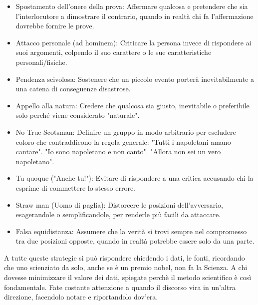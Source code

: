 \documentclass[12pt]{book} %
\begin{document}
\begin{itemize}
\item Spostamento dell’onere della prova: Affermare qualcosa e pretendere che sia l'interlocutore a dimostrare il contrario, quando in realtà chi fa l'affermazione dovrebbe fornire le prove.
\item Attacco personale (ad hominem): Criticare la persona invece di rispondere ai suoi argomenti, colpendo il suo carattere o le sue caratteristiche personali/fisiche.
\item Pendenza scivolosa: Sostenere che un piccolo evento porterà inevitabilmente a una catena di conseguenze disastrose.
\item Appello alla natura: Credere che qualcosa sia giusto, inevitabile o preferibile solo perché viene considerato "naturale".
\item No True Scotsman: Definire un gruppo in modo arbitrario per escludere coloro che contraddicono la regola generale: "Tutti i napoletani amano cantare". "Io sono napoletano e non canto". "Allora non sei un vero napoletano".
\item Tu quoque ("Anche tu!"): Evitare di rispondere a una critica accusando chi la esprime di commettere lo stesso errore.
\item Straw man (Uomo di paglia): Distorcere le posizioni dell’avversario, esagerandole o semplificandole, per renderle più facili da attaccare.
\item Falsa equidistanza: Assumere che la verità si trovi sempre nel compromesso tra due posizioni opposte, quando in realtà potrebbe essere solo da una parte.
\end{itemize}

A tutte queste strategie si può rispondere chiedendo i dati, le fonti, ricordando che uno scienziato da solo, anche se è un premio nobel, non fa la Scienza. A chi dovesse minimizzare il valore dei dati, spiegate perchè il metodo scientifico è così fondamentale. Fate costante attenzione a quando il discorso vira in un'altra direzione, facendolo notare e riportandolo dov'era.

\bigskip
\end{document}
